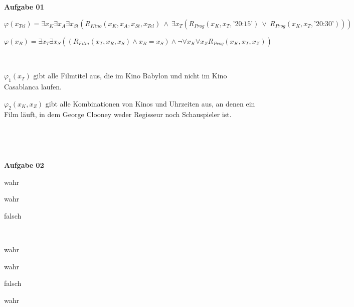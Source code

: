 \documentclass[a4paper,10pt]{article}
\begin{document}
	\parindent0pt
	\textbf{Aufgabe 01}
	\begin{compactenum} [(a)]
		\item \begin{compactenum} [(i)]
			\item $ \varphi(x_{Tel}) = \exists x_K \exists x_A \exists x_{St} (R_{Kino}(x_K, x_A, x_{St}, x_{Tel})\ \wedge \ \exists x_T (R_{Prog}(x_K, x_T, \text{'20:15'})\ \vee \ R_{Prog}(x_K, x_T, \text{'20:30'})))$
			\item $ \varphi(x_R) = \exists x_T \exists x_S ((R_{Film}(x_T, x_R, x_S) \wedge x_R = x_S) \wedge \lnot \forall x_K \forall x_Z R_{Prog}(x_K, x_T, x_Z))$
		\end{compactenum} \
		\item \begin{compactenum} [(i)]
		\item $ \varphi_1(x_T)  $ gibt alle Filmtitel aus, die im Kino Babylon und nicht im Kino Casablanca laufen. 
		\item $ \varphi_2(x_K,x_Z)  $ gibt alle Kombinationen von Kinos und Uhrzeiten aus, an denen ein Film läuft, in dem George Clooney weder Regisseur noch Schauspieler ist.
		\end{compactenum} \
	\end{compactenum} \

	\textbf{Aufgabe 02}
	\begin{compactenum} [(a)]
		\item \begin{compactenum} [(i)]
			\item wahr
			\item wahr
			\item falsch
		\end{compactenum} \
		\item \begin{compactenum} [(i)]
			\item wahr
			\item wahr
			\item falsch
			\item wahr
		\end{compactenum}
		\item \begin{compactenum} [(i)]
			\item 
			\item %
		\end{compactenum}
	\end{compactenum} \
\end{document}
